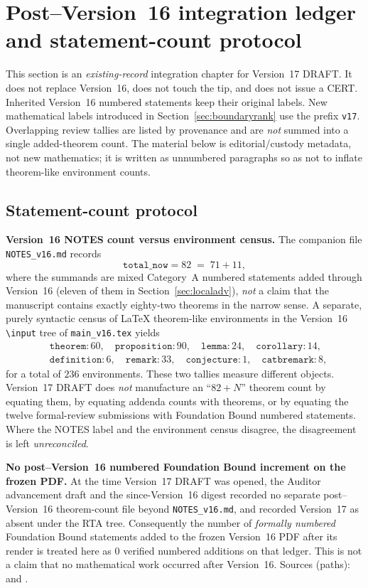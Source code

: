 \section{Post--Version~16 integration ledger and statement-count protocol}\label{sec:postv16}
This section is an \emph{existing-record} integration chapter for Version~17 DRAFT. It does not replace Version~16, does not touch the tip, and does not issue a CERT. Inherited Version~16 numbered statements keep their original labels. New mathematical labels introduced in Section~\ref{sec:boundaryrank} use the prefix \texttt{v17}. Overlapping review tallies are listed by provenance and are \emph{not} summed into a single added-theorem count. The material below is editorial/custody metadata, not new mathematics; it is written as unnumbered paragraphs so as not to inflate theorem-like environment counts.

\subsection{Statement-count protocol}
\noindent\textbf{Version~16 NOTES count versus environment census.}
The companion file \texttt{NOTES\_v16.md} records
\[
\mathtt{total\_now}=82\;=\;71+11,
\]
where the summands are mixed Category~A numbered statements added through Version~16 (eleven of them in Section~\ref{sec:localadv}), \emph{not} a claim that the manuscript contains exactly eighty-two theorems in the narrow sense.
A separate, purely syntactic census of LaTeX theorem-like environments in the Version~16 \texttt{\textbackslash input} tree of \texttt{main\_v16.tex} yields
\[
\begin{aligned}
&\texttt{theorem}:60,\quad
\texttt{proposition}:90,\quad
\texttt{lemma}:24,\quad
\texttt{corollary}:14,\\
&\texttt{definition}:6,\quad
\texttt{remark}:33,\quad
\texttt{conjecture}:1,\quad
\texttt{catbremark}:8,
\end{aligned}
\]
for a total of $236$ environments. These two tallies measure different objects. Version~17 DRAFT does \emph{not} manufacture an ``$82+N$'' theorem count by equating them, by equating addenda counts with theorems, or by equating the twelve formal-review submissions with Foundation Bound numbered statements. Where the NOTES label and the environment census disagree, the disagreement is left \emph{unreconciled}.

\noindent\textbf{No post--Version~16 numbered Foundation Bound increment on the frozen PDF.}
At the time Version~17 DRAFT was opened, the Auditor advancement draft and the since-Version~16 digest recorded no separate post--Version~16 theorem-count file beyond \texttt{NOTES\_v16.md}, and recorded Version~17 as absent under the RTA tree. Consequently the number of \emph{formally numbered} Foundation Bound statements added to the frozen Version~16 PDF after its render is treated here as $0$ verified numbered additions on that ledger. This is not a claim that no mathematical work occurred after Version~16. Sources (paths):  and .

